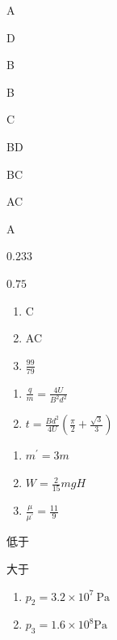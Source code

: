 \item A
\item D
\item B
\item \par 
\item B
\item \par 
\item C
\item \par 
\item BD
\item \par 
\item BC
\item \par 
\item AC
\item A
\item $ 0.233 $
\item $ 0.75 $
\item \begin {enumerate} \item C \item AC \item $\frac {99}{79}$ \end {enumerate}
\item \begin {enumerate} \renewcommand {\labelenumi }{\arabic {enumi}.} \item $\frac {q}{m}=\frac {4 U}{B^{2} d^{2}}$ \item $t=\frac {B d^{2}}{4 U}\left (\frac {\pi }{2}+\frac {\sqrt {3}}{3}\right )$ \par \end {enumerate} \par \par 
\item \begin {enumerate} \renewcommand {\labelenumi }{\arabic {enumi}.} \item $m^{\prime }=3 m$ \item $W=\frac {2}{15} m g H$ \item $\frac {\mu }{\mu ^{\prime }}=\frac {11}{9}$ \end {enumerate} \par \par 
\item 低于
\item 大于
\item \begin {enumerate} \renewcommand {\labelenumi }{\arabic {enumi}.} \item $p_{2}=3.2 \times 10^{7} \ \mathrm {Pa}$ \item $p_{3}=1.6 \times 10^{8} \mathrm {Pa}$ \par \end {enumerate} \par \par 

